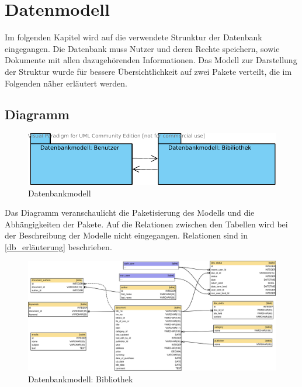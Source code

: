 \chapter{Datenmodell}
\label{kap4}
Im folgenden Kapitel wird auf die verwendete Strunktur der Datenbank
eingegangen. Die Datenbank muss Nutzer und deren Rechte speichern, sowie
Dokumente mit allen dazugehörenden Informationen. Das Modell zur Darstellung
der Struktur wurde für bessere Übersichtlichkeit auf zwei Pakete verteilt, die
im Folgenden näher erläutert werden.

\section{Diagramm}


\begin{figure}[H]
\includegraphics[width=1.0\linewidth]{bilder/db_wirelib-packages.pdf}
\caption{Datenbankmodell}
\label{fig:DBDiagramm}
\end{figure}

Das Diagramm veranschaulicht die Paketisierung des Modells und die
Abhängigkeiten der Pakete. Auf die Relationen zwischen den Tabellen wird bei
der Beschreibung der Modelle nicht eingegangen. Relationen sind in 
\ref{db_erläuterung} beschrieben.

\begin{figure}[H]
\includegraphics[width=1.0\linewidth]{bilder/database-wirelib_cluster-doc.pdf}
\caption{Datenbankmodell: Bibliothek}
\label{fig:DB_docDiagramm}
\end{figure}

